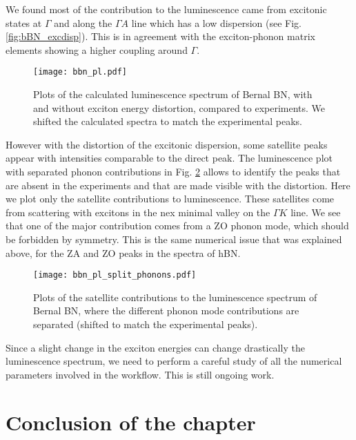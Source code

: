 We found most of the contribution to the luminescence came from excitonic states at $\Gamma$ and along the $\Gamma A$ line which has a low dispersion (see Fig. \ref{fig:bBN_excdisp}). This is in agreement with the exciton-phonon matrix elements showing a higher coupling around $\Gamma$.
\begin{figure}[h!b]
	\vspace{0.2cm}
	\setcapindent{2em}
	\centering
	\texttt{[image: bbn\_pl.pdf]}
	\caption{Plots of the calculated luminescence spectrum of Bernal BN, with and without exciton energy distortion, compared to experiments. We shifted the calculated spectra to match the experimental peaks.} %
    \label{fig:bBN_PL}
\end{figure}
However with the distortion of the excitonic dispersion, some satellite peaks appear with intensities comparable to the direct peak. The luminescence plot with separated phonon contributions in Fig. \ref{fig:bBN_PL_split_phonons} allows to identify the peaks that are absent in the experiments and that are made visible with the distortion. Here we plot only the satellite contributions to luminescence. These satellites come from scattering with excitons in the nex minimal valley on the $\Gamma K$ line. We see that one of the major contribution comes from a ZO phonon mode, which should be forbidden by symmetry. This is the same numerical issue that was explained above, for the ZA and ZO peaks in the spectra of \acrshort{hBN}.
\begin{figure}[h!b]
	\vspace{0.2cm}
	\setcapindent{2em}
	\centering
	\texttt{[image: bbn\_pl\_split\_phonons.pdf]}
	\caption{Plots of the satellite contributions to the luminescence spectrum of Bernal BN, where the different phonon mode contributions are separated (shifted to match the experimental peaks).} %
    \label{fig:bBN_PL_split_phonons}
\end{figure}

Since a slight change in the exciton energies can change drastically the luminescence spectrum, we need to perform a careful study of all the numerical parameters involved in the workflow. This is still ongoing work.


\section*{Conclusion of the chapter}

